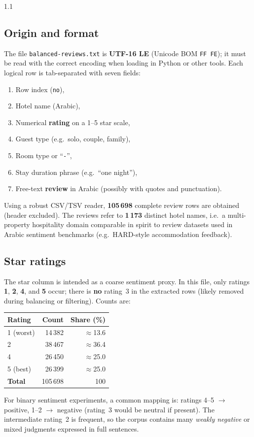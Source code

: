 \documentclass[11pt,a4paper]{report}
\begin{document}
\begin{spacing}{1.1}
\subsection{Origin and format}
The file \texttt{balanced-reviews.txt} is \textbf{UTF-16 LE} (Unicode BOM \texttt{FF FE}); it must be read with the correct encoding when loading in Python or other tools. Each logical row is tab-separated with seven fields:
\begin{enumerate}[noitemsep]
    \item Row index (\texttt{no}),
    \item Hotel name (Arabic),
    \item Numerical \textbf{rating} on a 1--5 star scale,
    \item Guest type (e.g.\ solo, couple, family),
    \item Room type or ``\texttt{-}'',
    \item Stay duration phrase (e.g.\ ``one night''),
    \item Free-text \textbf{review} in Arabic (possibly with quotes and punctuation).
\end{enumerate}
Using a robust CSV/TSV reader, \textbf{105\,698} complete review rows are obtained (header excluded). The reviews refer to \textbf{1\,173} distinct hotel names, i.e.\ a multi-property hospitality domain comparable in spirit to review datasets used in Arabic sentiment benchmarks (e.g.\ HARD-style accommodation feedback).

\subsection{Star ratings}
The star column is intended as a coarse sentiment proxy. In this file, only ratings \textbf{1}, \textbf{2}, \textbf{4}, and \textbf{5} occur; there is \textbf{no} rating~3 in the extracted rows (likely removed during balancing or filtering). Counts are:
\begin{center}
\begin{tabular}{@{}lrr@{}}
    \toprule
    \textbf{Rating} & \textbf{Count} & \textbf{Share (\%)} \\
    \midrule
    1 (worst)  & 14\,382 & $\approx$13.6 \\
    2          & 38\,467 & $\approx$36.4 \\
    4          & 26\,450 & $\approx$25.0 \\
    5 (best)   & 26\,399 & $\approx$25.0 \\
    \midrule
    \textbf{Total} & 105\,698 & 100 \\
    \bottomrule
\end{tabular}
\end{center}
For binary sentiment experiments, a common mapping is: ratings 4--5 $\rightarrow$ positive, 1--2 $\rightarrow$ negative (rating~3 would be neutral if present). The intermediate rating~2 is frequent, so the corpus contains many \emph{weakly negative} or mixed judgments expressed in full sentences.


\end{spacing}
\end{document}
